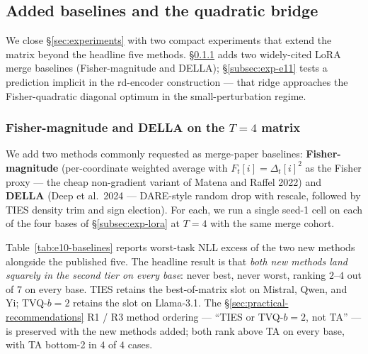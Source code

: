 
\subsection{Added baselines and the quadratic bridge}
\label{subsec:exp-e10-e11}

We close \S\ref{sec:experiments} with two compact experiments that
extend the matrix beyond the headline five methods. \S\ref{subsec:exp-e10}
adds two widely-cited LoRA merge baselines (Fisher-magnitude and DELLA);
\S\ref{subsec:exp-e11} tests a prediction implicit in the rd-encoder
construction --- that ridge approaches the Fisher-quadratic diagonal
optimum in the small-perturbation regime.

\subsubsection{Fisher-magnitude and DELLA on the $T=4$ matrix}
\label{subsec:exp-e10}

We add two methods commonly requested as merge-paper baselines:
\textbf{Fisher-magnitude} (per-coordinate weighted average with
$F_t[i] = \Delta_t[i]^2$ as the Fisher proxy --- the cheap
non-gradient variant of Matena and Raffel 2022) and \textbf{DELLA}
(Deep et al.\ 2024 --- DARE-style random drop with rescale, followed by
TIES density trim and sign election). For each, we run a single
seed-1 cell on each of the four bases of \S\ref{subsec:exp-lora} at
$T = 4$ with the same merge cohort.

Table~\ref{tab:e10-baselines} reports worst-task NLL excess of the
two new methods alongside the published five. The headline result is
that \emph{both new methods land squarely in the second tier on every
base}: never best, never worst, ranking $2$--$4$ out of $7$ on every
base. TIES retains the best-of-matrix slot on Mistral, Qwen, and Yi;
TVQ-$b{=}2$ retains the slot on Llama-3.1. The \S\ref{sec:practical-recommendations}
R1 / R3 method ordering --- ``TIES or TVQ-$b{=}2$, not TA'' --- is
preserved with the new methods added; both rank above TA on every
base, with TA bottom-2 in $4$ of $4$ cases.

